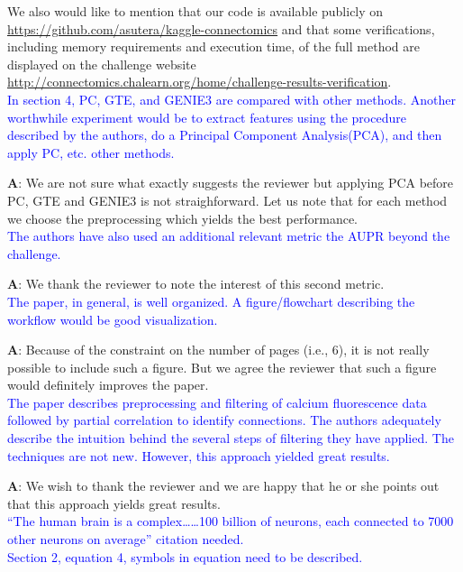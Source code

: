 \documentclass[wcp]{jmlr}
\begin{document}
We also would like to mention that our code is available publicly on \url{https://github.com/asutera/kaggle-connectomics} and that some verifications, including memory requirements and execution time, of the full method are displayed on the challenge website \url{http://connectomics.chalearn.org/home/challenge-results-verification}.\\

\noindent
\textcolor{blue}{In section 4, PC, GTE, and GENIE3 are compared with other methods. Another worthwhile experiment would be to extract features using the procedure described by the authors, do a Principal Component Analysis(PCA), and then apply PC, etc. other methods.}

\textbf{A}: We are not sure what exactly suggests the reviewer but applying PCA before PC, GTE and GENIE3 is not straighforward. Let us note that for each method we choose the preprocessing which yields the best performance.\\

\noindent
\textcolor{blue}{The authors have also used an additional relevant metric the AUPR beyond the challenge.}

\textbf{A}: We thank the reviewer to note the interest of this second metric.\\

\noindent
\textcolor{blue}{The paper, in general, is well organized. A figure/flowchart describing the workflow would be good visualization.}

\textbf{A}: Because of the constraint on the number of pages (i.e., $6$), it is not really possible to include such a figure. But we agree the reviewer that such a figure would definitely improves the paper.\\


\noindent
\textcolor{blue}{The paper describes preprocessing and filtering of calcium fluorescence data followed by partial correlation to identify connections.  The authors adequately describe the intuition behind the several steps of filtering they have applied.  The techniques are not new. However, this approach yielded great results.}

\textbf{A}: We wish to thank the reviewer and we are happy that he or she points out that this approach yields great results.\\

\noindent
\textcolor{blue}{“The human brain is a complex……100 billion of neurons, each connected to 7000 other neurons on average” citation needed.\\
Section 2, equation 4, symbols in equation need to be described.}
\end{document}
